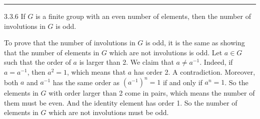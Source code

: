 \documentclass[a4paper, 12pt]{article}
\begin{document}
\noindent\rule{7in}{2.8pt}
\begin{problem}{3.3.6}
If \(G\) is a finite group with an even number of elements, then the number of involutions in \(G\) is odd.
\end{problem}
\begin{solution}
To prove that the number of involutions in \(G\) is odd, it is the same as showing that the number of elements in \(G\) which are not involutions is odd. 
Let \(a\in G\) such that the order of \(a\) is larger than 2. We claim that \(a\neq a^{-1}\). Indeed, if \(a=a^{-1}\), then \(a^2=1\), which means that \(a\) has order 2. A contradiction. 
Moreover, both \(a\) and \(a^{-1}\) has the same order as \((a^{-1})^n=1\) if and only if \(a^n=1\). So the elements in \(G\) with order larger than 2 come in pairs, which means the number of them must be even. 
And the identity element has order 1. So the number of elements in \(G\) which are not involutions must be odd. 
\end{solution}
\end{document}
